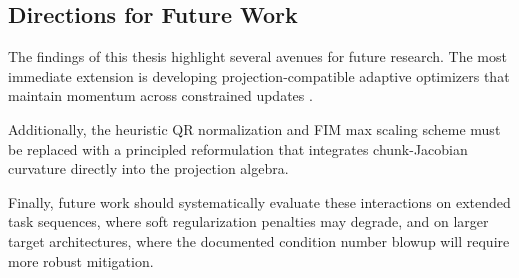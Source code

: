 \subsection{Directions for Future Work}
\label{sec:future_work}

The findings of this thesis highlight several avenues for future research. 
The most immediate extension is developing projection-compatible adaptive optimizers 
that maintain momentum across constrained updates \citep{hu_hidden_2026}. 

Additionally, the heuristic QR normalization and FIM max scaling scheme must be replaced 
with a principled reformulation that integrates chunk-Jacobian curvature directly into 
the projection algebra. 

Finally, future work should systematically evaluate these interactions on extended task 
sequences, where soft regularization penalties may degrade, and on larger target architectures, 
where the documented condition number blowup will require more robust mitigation.